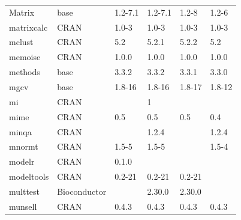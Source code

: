 \begin{longtable}{llllll}
\rowcolor{black!5}
Matrix                        & base                      & 1.2-7.1     & 1.2-7.1     & 1.2-8          & 1.2-6              \\
\rowcolor{black!10}
matrixcalc                    & CRAN                      & 1.0-3       & 1.0-3       & 1.0-3          & 1.0-3             \\
\rowcolor{black!5}
mclust                        & CRAN                      & 5.2         & 5.2.1       & 5.2.2          & 5.2                \\
\rowcolor{black!10}
memoise                       & CRAN                      & 1.0.0       & 1.0.0       & 1.0.0          & 1.0.0             \\
\rowcolor{black!5}
methods                       & base                      & 3.3.2       & 3.3.2       & 3.3.1          & 3.3.0              \\
\rowcolor{black!10}
mgcv                          & base                      & 1.8-16      & 1.8-16      & 1.8-17         & 1.8-12            \\
\rowcolor{black!5}
mi                            & CRAN                      &             & 1           &                &                    \\
\rowcolor{black!10}
mime                          & CRAN                      & 0.5         & 0.5         & 0.5            & 0.4               \\
\rowcolor{black!5}
minqa                         & CRAN                      &             & 1.2.4       &                & 1.2.4              \\
\rowcolor{black!10}
mnormt                        & CRAN                      & 1.5-5       & 1.5-5       &                & 1.5-4             \\
\rowcolor{black!5}
modelr                        & CRAN                      & 0.1.0       &             &                &                    \\
\rowcolor{black!10}
modeltools                    & CRAN                      & 0.2-21      & 0.2-21      & 0.2-21         &                   \\
\rowcolor{black!5}
multtest                      & Bioconductor              &             & 2.30.0      & 2.30.0         &                    \\
\rowcolor{black!10}
munsell                       & CRAN                      & 0.4.3       & 0.4.3       & 0.4.3          & 0.4.3             \\

\end{longtable}
